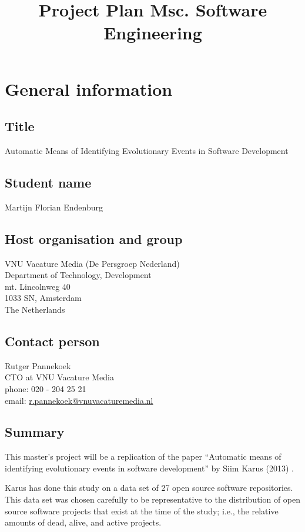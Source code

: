 \documentclass[9pt,a4paper]{article}
\title{\bf{Project Plan Msc. Software Engineering}}
\date{}
\begin{document}
\maketitle

\section{General information}
\subsection{Title}
Automatic Means of Identifying Evolutionary Events in Software Development

\subsection{Student name}
Martijn Florian Endenburg

\subsection{Host organisation and group}
VNU Vacature Media (De Persgroep Nederland) \\
Department of Technology, Development \\
mt. Lincolnweg 40 \\
1033 SN, Amsterdam \\
The Netherlands

\subsection{Contact person}
Rutger Pannekoek \\
CTO at VNU Vacature Media \\
phone: 020 - 204 25 21 \\
email:
\href{mailto:r.pannekoek@vnuvacaturemedia.nl}{r.pannekoek@vnuvacaturemedia.nl}

\subsection{Summary}
This master’s project will be a replication of the paper “Automatic means of
identifying evolutionary events in software development” by Siim Karus (2013)
\cite{karus2013}.

Karus has done this study on a data set of 27 open source software
repositories. This data set was chosen carefully to be representative to the
distribution of open source software projects that exist at the time of the
study; i.e., the relative amounts of dead, alive, and active projects.
\end{document}
